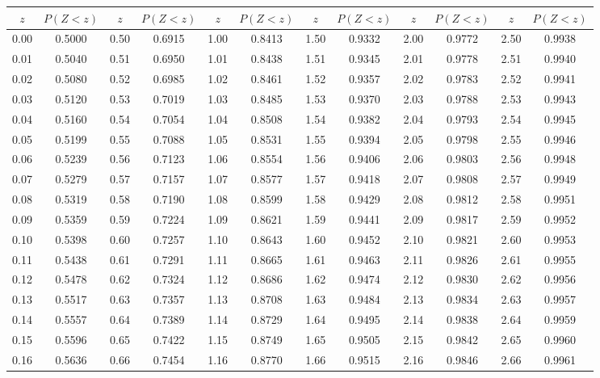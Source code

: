 \documentclass[12pt,letterpaper]{article}
\begin{document}
\begin{center} \footnotesize
\renewcommand{\arraystretch}{1.1}
\begin{tabular}{c c | c c | c c | c c | c c | c c}
$z$ & $P(Z<z)$ & $z$ & $P(Z<z)$ & $z$ & $P(Z<z)$ & $z$ & $P(Z<z)$ & $z$ & $P(Z<z)$ & $z$ & $P(Z<z)$\\ \hline
0.00 & 0.5000 & 0.50 & 0.6915 & 1.00 & 0.8413 & 1.50 & 0.9332 & 2.00 & 0.9772 & 2.50 & 0.9938 \\
0.01 & 0.5040 & 0.51 & 0.6950 & 1.01 & 0.8438 & 1.51 & 0.9345 & 2.01 & 0.9778 & 2.51 & 0.9940 \\
0.02 & 0.5080 & 0.52 & 0.6985 & 1.02 & 0.8461 & 1.52 & 0.9357 & 2.02 & 0.9783 & 2.52 & 0.9941 \\
0.03 & 0.5120 & 0.53 & 0.7019 & 1.03 & 0.8485 & 1.53 & 0.9370 & 2.03 & 0.9788 & 2.53 & 0.9943 \\
0.04 & 0.5160 & 0.54 & 0.7054 & 1.04 & 0.8508 & 1.54 & 0.9382 & 2.04 & 0.9793 & 2.54 & 0.9945 \\
0.05 & 0.5199 & 0.55 & 0.7088 & 1.05 & 0.8531 & 1.55 & 0.9394 & 2.05 & 0.9798 & 2.55 & 0.9946 \\
0.06 & 0.5239 & 0.56 & 0.7123 & 1.06 & 0.8554 & 1.56 & 0.9406 & 2.06 & 0.9803 & 2.56 & 0.9948 \\
0.07 & 0.5279 & 0.57 & 0.7157 & 1.07 & 0.8577 & 1.57 & 0.9418 & 2.07 & 0.9808 & 2.57 & 0.9949 \\
0.08 & 0.5319 & 0.58 & 0.7190 & 1.08 & 0.8599 & 1.58 & 0.9429 & 2.08 & 0.9812 & 2.58 & 0.9951 \\
0.09 & 0.5359 & 0.59 & 0.7224 & 1.09 & 0.8621 & 1.59 & 0.9441 & 2.09 & 0.9817 & 2.59 & 0.9952 \\
0.10 & 0.5398 & 0.60 & 0.7257 & 1.10 & 0.8643 & 1.60 & 0.9452 & 2.10 & 0.9821 & 2.60 & 0.9953 \\
0.11 & 0.5438 & 0.61 & 0.7291 & 1.11 & 0.8665 & 1.61 & 0.9463 & 2.11 & 0.9826 & 2.61 & 0.9955 \\
0.12 & 0.5478 & 0.62 & 0.7324 & 1.12 & 0.8686 & 1.62 & 0.9474 & 2.12 & 0.9830 & 2.62 & 0.9956 \\
0.13 & 0.5517 & 0.63 & 0.7357 & 1.13 & 0.8708 & 1.63 & 0.9484 & 2.13 & 0.9834 & 2.63 & 0.9957 \\
0.14 & 0.5557 & 0.64 & 0.7389 & 1.14 & 0.8729 & 1.64 & 0.9495 & 2.14 & 0.9838 & 2.64 & 0.9959 \\
0.15 & 0.5596 & 0.65 & 0.7422 & 1.15 & 0.8749 & 1.65 & 0.9505 & 2.15 & 0.9842 & 2.65 & 0.9960 \\
0.16 & 0.5636 & 0.66 & 0.7454 & 1.16 & 0.8770 & 1.66 & 0.9515 & 2.16 & 0.9846 & 2.66 & 0.9961 \\

\end{tabular}
\end{center}
\end{document}
